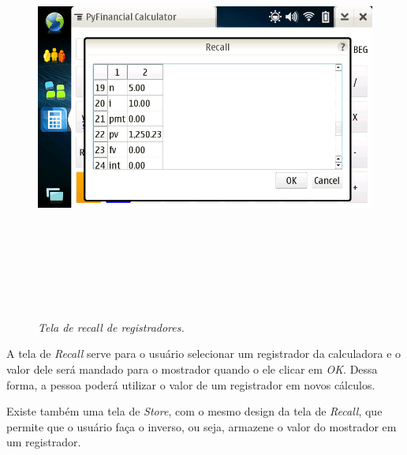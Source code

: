 \begin{figure}[!h]
 \includegraphics[height = 14cm]{tela_recall.png}
 \caption{\it Tela de \textit{recall} de registradores.} \label{tab:tela_recall}
\end{figure}

A tela de \textit{Recall} serve para o usuário selecionar um registrador da calculadora e o valor
dele será mandado para o mostrador quando o ele clicar em \textit{OK}. Dessa forma, a pessoa poderá
utilizar o valor de um registrador em novos cálculos.

Existe também uma tela de \textit{Store}, com o mesmo design da tela de \textit{Recall}, que permite que o
usuário faça o inverso, ou seja, armazene o valor do mostrador em um registrador.